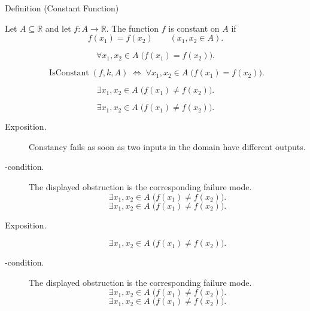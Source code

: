\begin{definitionbox}{Definition (Constant Function)}
\begin{definition}
\label{def:function-constant}
Let $A\subseteq\mathbb{R}$ and let $f:A\to\mathbb{R}$.  The function
$f$ is constant on $A$ if
\[
  f(x_1)=f(x_2)
  \qquad (x_1,x_2\in A).
\]
\end{definition}
\end{definitionbox}

\begin{remark*}
\[
  \forall x_1,x_2\in A\;\bigl(f(x_1)=f(x_2)\bigr).
\]
\end{remark*}

\begin{remark*}
\[
  \operatorname{IsConstant}(f,k,A)
  \;\Longleftrightarrow\;
  \forall x_1,x_2\in A\;\bigl(f(x_1)=f(x_2)\bigr).
\]
\end{remark*}

\begin{remark*}
\[
  \exists x_1,x_2\in A\;\bigl(f(x_1)\neq f(x_2)\bigr).
\]
\end{remark*}

\begin{remark*}
\[
  \exists x_1,x_2\in A\;\bigl(f(x_1)\neq f(x_2)\bigr).
\]
\end{remark*}



\begin{remark*}
\begin{description}
  \item[Exposition.]
Constancy fails as soon as two inputs in the domain have different outputs.


  \item[\exists-condition.]
  The displayed obstruction is the corresponding failure mode.
  \[
  \exists x_1,x_2\in A\;\bigl(f(x_1)\neq f(x_2)\bigr).
\]
  \[
  \exists x_1,x_2\in A\;\bigl(f(x_1)\neq f(x_2)\bigr).
\]
\end{description}
\end{remark*}

\begin{remark*}
\begin{description}
  \item[Exposition.]
\[
  \exists x_1,x_2\in A\;\bigl(f(x_1)\neq f(x_2)\bigr).
\]


  \item[\exists-condition.]
  The displayed obstruction is the corresponding failure mode.
  \[
  \exists x_1,x_2\in A\;\bigl(f(x_1)\neq f(x_2)\bigr).
\]
  \[
  \exists x_1,x_2\in A\;\bigl(f(x_1)\neq f(x_2)\bigr).
\]
\end{description}
\end{remark*}

